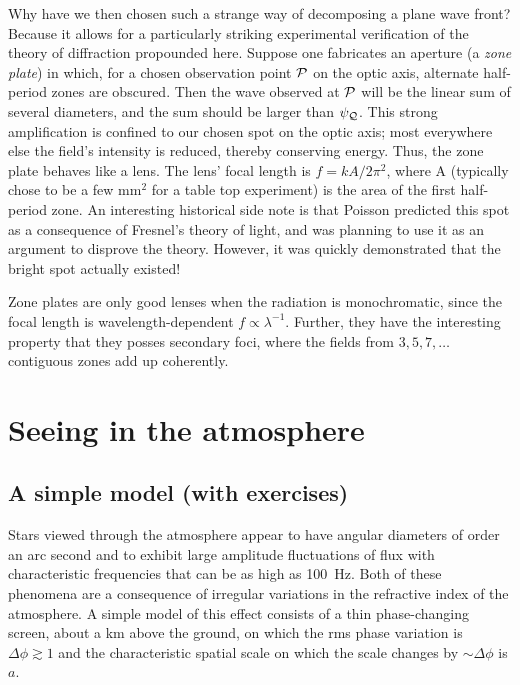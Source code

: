 Why have we then chosen such a strange way of decomposing a plane wave front? 
Because it allows for a particularly striking experimental verification of the
theory of diffraction propounded here. Suppose one fabricates an aperture 
(a {\it zone plate}) in which, for a chosen observation point $\cal{P}$ on the 
optic axis, alternate half-period zones are obscured. Then the wave 
observed at $\cal{P}$ will be the linear sum of several diameters, and the sum
should be larger than $\psi_{\cal{Q}}$. This strong amplification is confined to
our chosen spot on the optic axis; most everywhere else the field's intensity
is reduced, thereby conserving energy. 
Thus, the zone plate behaves like a lens. 
The lens' focal length is $f={kA/2\pi^2}$, where A (typically chose to be a 
few mm$^2$ for a table top experiment) is the area of the first half-period 
zone. An interesting historical side note is that Poisson predicted this spot
as a consequence of Fresnel's theory of light, and was planning to use it
as an argument to disprove the theory. However, it was quickly demonstrated 
that the bright spot actually existed!

Zone plates are only good lenses when the radiation is monochromatic, since
the focal length is wavelength-dependent $f\propto \lambda^{-1}$. Further, they
have 
the interesting property that they posses secondary foci, where the fields from
$3,5,7,\ldots$ contiguous zones add up coherently.

\section{Seeing in the atmosphere}

\subsection{A simple model (with exercises)} \label{sec:seeing-model}

Stars viewed through the atmosphere appear to have angular diameters of 
order an arc second and to exhibit large amplitude fluctuations of flux with
characteristic frequencies that can be as high as 100~Hz. Both of these 
phenomena are a consequence of irregular variations in the refractive
index of the atmosphere. A simple model of this effect consists of a thin
phase-changing screen, about a km above the ground, on which the rms phase
variation is $\Delta\phi\gtrsim 1$ and the characteristic spatial scale on 
which the scale changes by $\sim\Delta\phi$ is $a$.

